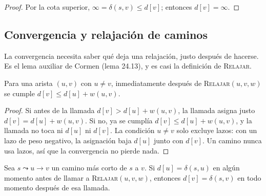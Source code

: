 \documentclass[11pt,letterpaper]{article}
\begin{document}
\begin{proof}
  Por la cota superior, $\infty = \delta(s, v) \le d[v]$; entonces
  $d[v] = \infty$.
\end{proof}


\subsection*{Convergencia y relajación de caminos}

La convergencia necesita saber qué deja una relajación, justo
después de hacerse. Es el lema auxiliar de Cormen (lema 24.13), y es
casi la definición de \textsc{Relajar}.

\begin{lema}
  \label{lem:prueba-tras-relajar}
  Para una arista $(u, v)$ con $u \ne v$, inmediatamente después de
  \textsc{Relajar}$(u, v, w)$ se cumple
  $d[v] \le d[u] + w(u, v)$.
\end{lema}

\begin{proof}
  Si antes de la llamada $d[v] > d[u] + w(u, v)$, la llamada asigna
  justo $d[v] = d[u] + w(u, v)$. Si no, ya se cumplía
  $d[v] \le d[u] + w(u, v)$, y la llamada no toca ni $d[u]$ ni
  $d[v]$. La condición $u \ne v$ solo excluye lazos: con un lazo de
  peso negativo, la asignación baja $d[u]$ junto con $d[v]$. Un camino
  nunca usa lazos, así que la convergencia no pierde nada.
\end{proof}

\begin{lema}
  \label{lem:prueba-convergencia}
  Sea $s \leadsto u \to v$ un camino más corto de $s$ a $v$. Si
  $d[u] = \delta(s, u)$ en algún momento antes de llamar a
  \textsc{Relajar}$(u, v, w)$, entonces $d[v] = \delta(s, v)$ en todo
  momento después de esa llamada.
\end{lema}
\end{document}
